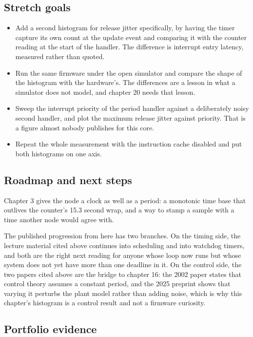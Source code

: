 \subsection*{Stretch goals}

\begin{itemize}
\item Add a second histogram for release jitter specifically, by having the
timer capture its own count at the update event and comparing it with the
counter reading at the start of the handler. The difference is interrupt entry
latency, measured rather than quoted.
\item Run the same firmware under the open simulator and compare the shape of
the histogram with the hardware's. The differences are a lesson in what a
simulator does not model, and chapter 20 needs that lesson.
\item Sweep the interrupt priority of the period handler against a deliberately
noisy second handler, and plot the maximum release jitter against priority. That
is a figure almost nobody publishes for this core.
\item Repeat the whole measurement with the instruction cache disabled and put
both histograms on one axis.
\end{itemize}

\subsection*{Roadmap and next steps}

Chapter 3 gives the node a clock as well as a period: a monotonic time base that
outlives the counter's 15.3 second wrap, and a way to stamp a sample with a time
another node would agree with.

The published progression from here has two branches. On the timing side, the
lecture material cited above continues into scheduling and into watchdog timers,
and both are the right next reading for anyone whose loop now runs but whose
system does not yet have more than one deadline in it. On the control side, the
two papers cited above are the bridge to chapter 16: the 2002 paper states that
control theory assumes a constant period, and the 2025 preprint shows that
varying it perturbs the plant model rather than adding noise, which is why this
chapter's histogram is a control result and not a firmware curiosity.

\subsection*{Portfolio evidence}

